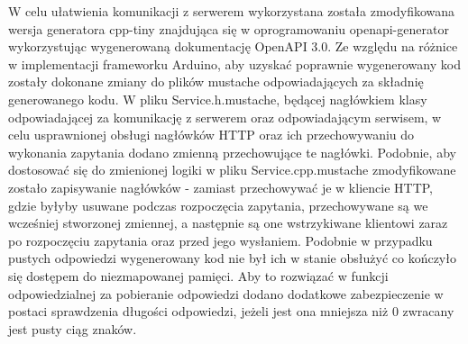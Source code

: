 W celu ułatwienia komunikacji z serwerem wykorzystana została zmodyfikowana wersja
generatora cpp-tiny znajdująca się w oprogramowaniu openapi-generator wykorzystując
wygenerowaną dokumentację OpenAPI 3.0. 
Ze względu na różnice w implementacji frameworku Arduino, aby uzyskać poprawnie 
wygenerowany kod zostały dokonane zmiany do plików mustache odpowiadających za składnię
generowanego kodu. W pliku Service.h.mustache, będącej nagłówkiem klasy odpowiadającej za komunikację z serwerem
oraz odpowiadającym serwisem, w celu usprawnionej obsługi nagłówków
HTTP oraz ich przechowywaniu do wykonania zapytania dodano zmienną przechowujące te nagłówki.
Podobnie, aby dostosować się do zmienionej logiki w pliku Service.cpp.mustache zmodyfikowane
zostało zapisywanie nagłówków - zamiast przechowywać je w kliencie HTTP, gdzie byłyby usuwane podczas
rozpoczęcia zapytania, przechowywane są we wcześniej stworzonej zmiennej, a następnie są one
wstrzykiwane klientowi zaraz po rozpoczęciu zapytania oraz przed jego wysłaniem.
Podobnie w przypadku pustych odpowiedzi wygenerowany kod nie był ich w stanie obsłużyć
co kończyło się dostępem do niezmapowanej pamięci. Aby to rozwiązać w funkcji odpowiedzialnej 
za pobieranie odpowiedzi dodano dodatkowe zabezpieczenie w postaci sprawdzenia
długości odpowiedzi, jeżeli jest ona mniejsza niż 0 zwracany jest pusty ciąg znaków.



